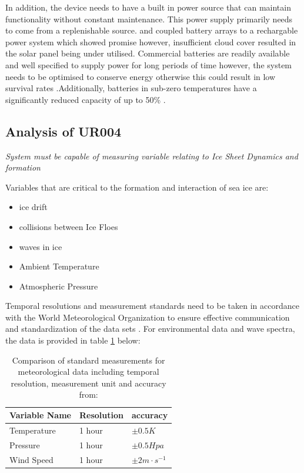 In addition, the device needs to have a built in power source that can maintain functionality without constant maintenance. This power supply primarily needs to come from a replenishable source. \textcite{doble2017robust} and \textcite{rabault2019open} coupled battery arrays to a rechargable power system which showed promise however, insufficient cloud cover \cite{doble2017robust} resulted in the solar panel being under utilised. Commercial batteries are readily available and well specified to supply power for long periods of time \cite{rabault2017measurements} however, the system needs to be optimised to conserve energy otherwise this could result in low survival rates \cite{kohout2015device}.Additionally, batteries in sub-zero temperatures have a significantly reduced capacity of up to 50\% \cite{doble2017robust}.

\subsection{Analysis of UR004}

\textit{System must be capable of measuring variable relating to Ice Sheet Dynamics and formation}

Variables that are critical to the formation and interaction of sea ice are:
\begin{itemize}
       \item ice drift
       \item collisions between Ice Floes
       \item waves in ice
       \item Ambient Temperature
       \item Atmospheric Pressure
\end{itemize}

Temporal resolutions and measurement standards need to be taken in accordance with the World Meteorological Organization to ensure effective communication and standardization of the data sets \cite{worldmeteorologicalorganization_2010}. For environmental data and wave spectra, the data is provided in table \ref{tab:metocean} below:

\begin{table}[H]
    \centering
    \caption{Comparison of standard measurements for meteorological data including temporal resolution, measurement unit and accuracy from: \cite{worldmeteorologicalorganization_2010}}
    \begin{tabular}{|l|l|l|}
    \hline
        \textbf{Variable Name}  & \textbf{Resolution} & \textbf{accuracy}\\
        \hline
         Temperature & 1 hour & $\pm 0.5 K$ \\
         \hline
         Pressure & 1 hour & $\pm 0.5Hpa$ \\
         \hline 
         Wind Speed & 1 hour & $\pm 2 m\cdot s^{-1}$\\
         \hline
    \end{tabular}
    \label{tab:metocean}
\end{table}

